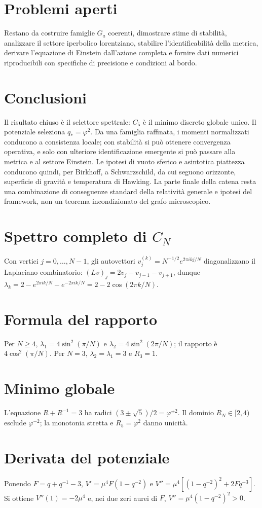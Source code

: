 \documentclass[11pt,a4paper]{article}
\begin{document}
\section{Problemi aperti}
Restano da costruire famiglie $G_a$ coerenti, dimostrare stime di stabilità, analizzare il settore iperbolico lorentziano, stabilire l'identificabilità della metrica, derivare l'equazione di Einstein dall'azione completa e fornire dati numerici riproducibili con specifiche di precisione e condizioni al bordo.
\section{Conclusioni}
Il risultato chiuso è il selettore spettrale: $C_5$ è il minimo discreto globale unico. Il potenziale seleziona $q_*=\varphi^2$. Da una famiglia raffinata, i momenti normalizzati conducono a consistenza locale; con stabilità si può ottenere convergenza operativa, e solo con ulteriore identificazione emergente si può passare alla metrica e al settore Einstein. Le ipotesi di vuoto sferico e asintotica piattezza conducono quindi, per Birkhoff, a Schwarzschild, da cui seguono orizzonte, superficie di gravità e temperatura di Hawking. La parte finale della catena resta una combinazione di conseguenze standard della relatività generale e ipotesi del framework, non un teorema incondizionato del grafo microscopico.
\appendix
\section{Spettro completo di $C_N$}
Con vertici $j=0,\ldots,N-1$, gli autovettori $v^{(k)}_j=N^{-1/2}e^{2\pi ikj/N}$ diagonalizzano il Laplaciano combinatorio: $(Lv)_j=2v_j-v_{j-1}-v_{j+1}$, dunque $\lambda_k=2-e^{2\pi ik/N}-e^{-2\pi ik/N}=2-2\cos(2\pi k/N)$.
\section{Formula del rapporto}
Per $N\ge4$, $\lambda_1=4\sin^2(\pi/N)$ e $\lambda_2=4\sin^2(2\pi/N)$; il rapporto è $4\cos^2(\pi/N)$. Per $N=3$, $\lambda_2=\lambda_1=3$ e $R_3=1$.
\section{Minimo globale}
L'equazione $R+R^{-1}=3$ ha radici $(3\pm\sqrt5)/2=\varphi^{\pm2}$. Il dominio $R_N\in[2,4)$ esclude $\varphi^{-2}$; la monotonia stretta e $R_5=\varphi^2$ danno unicità.
\section{Derivata del potenziale}
Ponendo $F=q+q^{-1}-3$, $V'=\mu^4F(1-q^{-2})$ e $V''=\mu^4[(1-q^{-2})^2+2Fq^{-3}]$. Si ottiene $V''(1)=-2\mu^4$ e, nei due zeri aurei di $F$, $V''=\mu^4(1-q^{-2})^2>0$.
\end{document}
